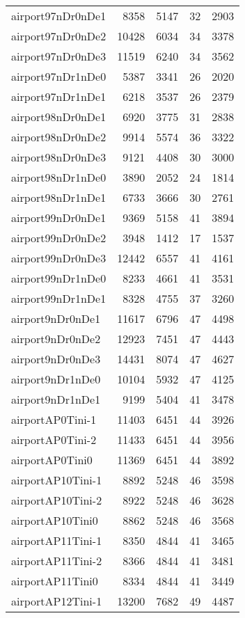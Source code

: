 \begin{longtable}{lrrrr}
airport97nDr0nDe1 & 8358 & 5147 & 32 & 2903 \\
airport97nDr0nDe2 & 10428 & 6034 & 34 & 3378 \\
airport97nDr0nDe3 & 11519 & 6240 & 34 & 3562 \\
airport97nDr1nDe0 & 5387 & 3341 & 26 & 2020 \\
airport97nDr1nDe1 & 6218 & 3537 & 26 & 2379 \\
airport98nDr0nDe1 & 6920 & 3775 & 31 & 2838 \\
airport98nDr0nDe2 & 9914 & 5574 & 36 & 3322 \\
airport98nDr0nDe3 & 9121 & 4408 & 30 & 3000 \\
airport98nDr1nDe0 & 3890 & 2052 & 24 & 1814 \\
airport98nDr1nDe1 & 6733 & 3666 & 30 & 2761 \\
airport99nDr0nDe1 & 9369 & 5158 & 41 & 3894 \\
airport99nDr0nDe2 & 3948 & 1412 & 17 & 1537 \\
airport99nDr0nDe3 & 12442 & 6557 & 41 & 4161 \\
airport99nDr1nDe0 & 8233 & 4661 & 41 & 3531 \\
airport99nDr1nDe1 & 8328 & 4755 & 37 & 3260 \\
airport9nDr0nDe1 & 11617 & 6796 & 47 & 4498 \\
airport9nDr0nDe2 & 12923 & 7451 & 47 & 4443 \\
airport9nDr0nDe3 & 14431 & 8074 & 47 & 4627 \\
airport9nDr1nDe0 & 10104 & 5932 & 47 & 4125 \\
airport9nDr1nDe1 & 9199 & 5404 & 41 & 3478 \\
airportAP0Tini-1 & 11403 & 6451 & 44 & 3926 \\
airportAP0Tini-2 & 11433 & 6451 & 44 & 3956 \\
airportAP0Tini0 & 11369 & 6451 & 44 & 3892 \\
airportAP10Tini-1 & 8892 & 5248 & 46 & 3598 \\
airportAP10Tini-2 & 8922 & 5248 & 46 & 3628 \\
airportAP10Tini0 & 8862 & 5248 & 46 & 3568 \\
airportAP11Tini-1 & 8350 & 4844 & 41 & 3465 \\
airportAP11Tini-2 & 8366 & 4844 & 41 & 3481 \\
airportAP11Tini0 & 8334 & 4844 & 41 & 3449 \\
airportAP12Tini-1 & 13200 & 7682 & 49 & 4487 \\

\end{longtable}

